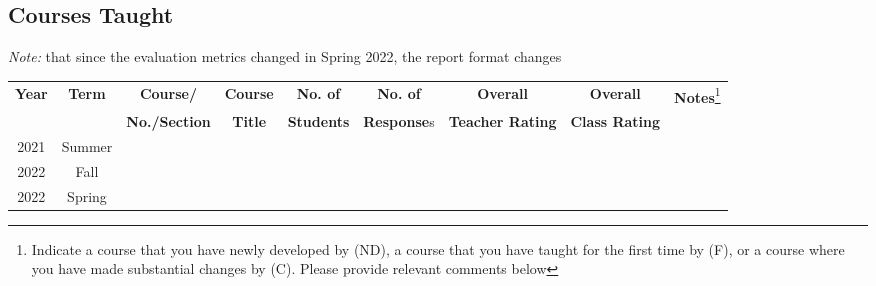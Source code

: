 \documentclass[11pt]{article}
\begin{document}
\subsection{Courses Taught}
\emph{Note:} that since the evaluation metrics changed in Spring 2022, the report format changes
\begin{center}
  \footnotesize
  \begin{tabular}{ccccccccc}
    \toprule
    \textbf{Year}&\textbf{Term}&\textbf{Course/}&\textbf{Course}&\textbf{No. of}&\textbf{No. of}&\textbf{Overall}&\textbf{Overall}&\textbf{Notes}\footnote{Indicate a course that you have newly developed by (ND), a course that you have taught for the first time by (F), or a course where you have made substantial changes by (C).  Please provide relevant comments below}\\
    &&\textbf{No./Section}&\textbf{Title}&\textbf{Students}&\textbf{Response}s& \textbf{Teacher Rating}& \textbf{Class Rating}&\\
    \midrule
    2021& Summer & & & & & & &\\
    \midrule
    2022& Fall & & & & & & &\\
    \bottomrule
    2022& Spring & & & & & & &\\
    \bottomrule
  \end{tabular}
\end{center}


% 
\end{document}
